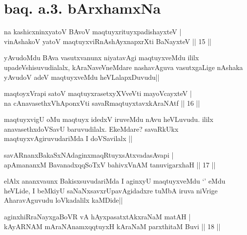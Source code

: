 \section*{baq. a.3. bArxhamxNa}


\begin{shl}
na kashicxninxyatoV BAvoV maqtuyxrituyxpadishayxteV |\\
vinAshakoV yatoV maqtuyxviRnAshAyxnapxrXti BaNayxteV \hfill || 15 ||
\end{shl}

\begin{artha}
yAvudoMdu BAva vasutxvanunx niyatavAgi maqtuyxveMdu ililx upadeVshisuvudialalx, 
kAraNaveVneMdare nashavAguva vasutxgaLige nAshaka yAvudoV adeV maqtuyxveMdu heVLalapxDuvudu||
\end{artha}


\begin{shl}
maqtoyxVrapi satoV maqtuyxrasetxyXVveVti mayoVcayxteV |\\
na cAnavasethxVhA\s \s ponxVti savaRmaqtuyxtavxkAraNAtf \hfill || 16 ||
\end{shl}

\begin{artha}
maqtuyxvigU oMu maqtuyx idedxV iruveMdu nAvu heVLuvudu. ililx anavasethxdoVSavU 
baruvudilalx. EkeMdare? savaRkUkx maqtuyxvAgiruvudariMda I doVSavilalx ||
\end{artha}

\begin{shl}
savARnanxBakaSxNAdaginxmaqRtuyxsAtxvadasAvapi |\\
apAmananxM BavanadxqqSoTxV bahivxVnAM tanuvigarxhaH \hfill || 17 ||
\end{shl}

\begin{artha}
elAlx ananxvaunx BakisxsuvudariMda I aginxyU maqtuyxveMdu `\stext'  eMdu heVLide, I 
beMkiyU saNaNxsavxrUpavAgidadxre tuMbA iruva niVrige AharavAguvudu loVkadalilx kaMDide||
\end{artha}


\begin{shl}
aginxhiRraNayxgaBoVR vA hAyxpasatxtAkxraNaM matAH |\\
kAyARNAM mAraNAnamxqqtuyxH kAraNaM parxthitaM Buvi \hfill || 18 ||
\end{shl}

